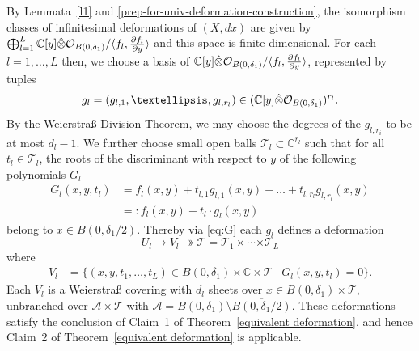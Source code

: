 \documentclass[11pt,twoside]{amsart}
\theoremstyle{plain}
\newcommand{\Am}{\mathcal{A}}
\newcommand{\Tm}{\mathcal{T}}
\newcommand{\Sh}[1]{\mathcal{#1}} %
\newcommand{\dfx}{dx}
\begin{document}
By Lemmata~\ref{l1} and \ref{prep-for-univ-deformation-construction}, the isomorphism classes of infinitesimal deformations of $(X,\dfx) $ are given by  $ \bigoplus _{l = 1} ^ L \mathbb{C}[y]\Hat{\otimes}\Sh{O}_{B(0,\delta_1)}/\langle f_l,\tfrac{\partial f_l}{\partial y}\rangle$ and this space is finite-dimensional.  For each $l=1,\ldots,L$ then, we choose a basis of $\mathbb{C}[y]\Hat{\otimes}\Sh{O}_{B(0,\delta_1)}/\langle f_l,\tfrac{\partial f_l}{\partial y}\rangle$, represented by tuples 
\begin {equation}\label {equation:basis}
 g_l=(g_{l,1},\ldots, g_{l,r_l})\in(\mathbb{C}[y]\Hat{\otimes}\Sh{O}_{B(0,\delta_1)})^{r_l}.
\end {equation}
 By the Weierstra{\ss} Division Theorem, we may choose the degrees of the $g_{l,r_i}$ to be at most $d_l-1$. We further choose small open balls $\Tm_l\subset\mathbb{C}^{r_l}$ such that for all $t_l\in\Tm_l$, the roots of the discriminant with respect to $y$ of the following polynomials $G_l$
\begin{align} %
	G_l(x,y,t_l)&=f_l(x,y)+t_{l,1}g_{l,1}(x,y)+\ldots+t_{l,r_l}\label {eq:G}
	g_{l,r_l}(x,y)\\&=:f_l(x,y)+t_l\cdot g_l(x,y)\nonumber
\end{align}
belong to $x\in B(0,\delta_1/2)$. Thereby via  \eqref {eq:G}
each $ g_l $ defines a deformation
\begin {equation}\label{eq:deformation}
U_l\rightarrow V_l \twoheadrightarrow \mathcal T =\mathcal T_1\times\cdots\mathcal \times \mathcal{T}_L 
\end {equation}
where
\begin{align}\label{eq:zl}
	V_l&=\{(x,y,t_1,\ldots,t_L)\in B(0,\delta_1)\times\mathbb{C}\times\Tm\mid G_l(x,y,t_l)=0\}.
\end{align}
Each $ V_l $ is a Weierstra{\ss} covering with $ d_l $ sheets over $x\in B(0,\delta_1)\times\Tm$, unbranched over $\Am\times\Tm$ with $\Am=B(0,\delta_1)\setminus\overline{B(0,\delta_1/2)}$. These deformations satisfy the conclusion of Claim~1 of Theorem~\ref{equivalent deformation}, and hence Claim~2 of Theorem~\ref{equivalent deformation} is applicable.
\end{document}
